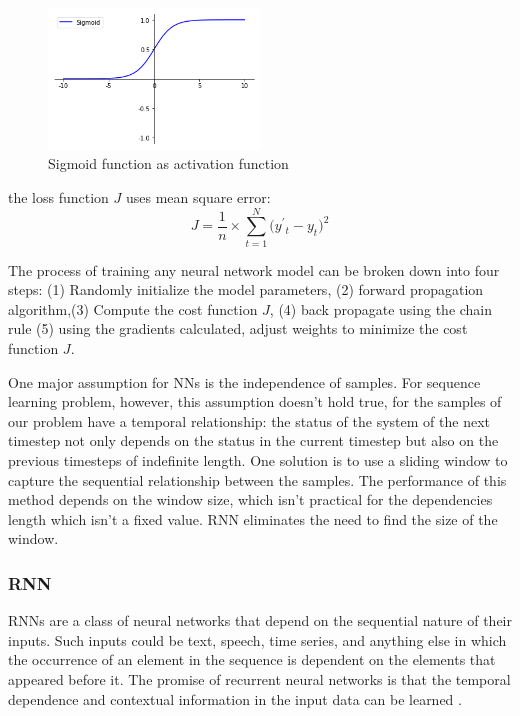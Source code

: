 \documentclass[5p]{elsarticle}
\begin{document}
\begin{figure}[h]
    \centering
    \includegraphics[width=0.5\textwidth]{sigmoid.png}
    \caption{Sigmoid function as activation function}
    \label{fig:sigmoid}
\end{figure}

the loss function $J$ uses mean square error:
    $$J=\frac{1}{n}\times{\sum_{t=1}^N(y^{'}{_t}-y_t})^2$$

The process of training any neural network model can be broken down into four steps: (1) Randomly initialize the model parameters, (2) forward propagation algorithm,(3) Compute the cost function $J$, (4) back propagate using the chain rule  (5) using the gradients calculated, adjust weights to minimize the cost function $J$.

One major assumption for NNs is the independence of samples. For sequence learning problem, however, this assumption doesn't hold true, for the samples of our problem have a temporal relationship: the status of the system of the next timestep not only depends on the status in the current timestep but also on the previous timesteps of indefinite length. One solution is to use a sliding window to capture the sequential relationship between the samples. The performance of this method depends on the window size, which isn't practical for the dependencies length which isn't a fixed value. RNN eliminates the need to find the size of the window\cite{HermansTrainingNetworks}. 

\subsubsection{RNN}

RNNs are a class of neural networks that depend on the sequential nature of their inputs. Such inputs could be text, speech, time series, and anything else in which the occurrence of an element in the sequence is dependent on the elements that appeared before it. The promise of recurrent neural networks is that the temporal dependence and contextual information in the input data can be learned\cite{Bengio1994LearningDifficult} \cite{ChoLearningTranslation}. 
\end{document}
